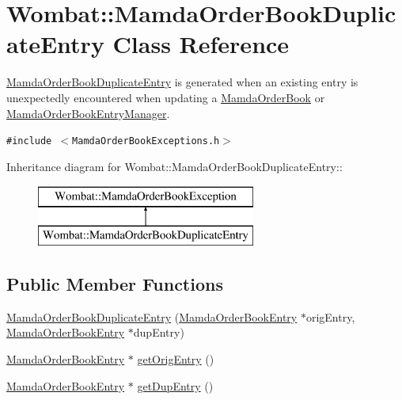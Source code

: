 \hypertarget{classWombat_1_1MamdaOrderBookDuplicateEntry}{
\section{Wombat::Mamda\-Order\-Book\-Duplicate\-Entry Class Reference}
\label{classWombat_1_1MamdaOrderBookDuplicateEntry}
}
\hyperlink{classWombat_1_1MamdaOrderBookDuplicateEntry}{Mamda\-Order\-Book\-Duplicate\-Entry} is generated when an existing entry is unexpectedly encountered when updating a \hyperlink{classWombat_1_1MamdaOrderBook}{Mamda\-Order\-Book} or \hyperlink{classWombat_1_1MamdaOrderBookEntryManager}{Mamda\-Order\-Book\-Entry\-Manager}.  


{\tt \#include $<$Mamda\-Order\-Book\-Exceptions.h$>$}

Inheritance diagram for Wombat::Mamda\-Order\-Book\-Duplicate\-Entry::\begin{figure}[H]
\begin{center}
\leavevmode
\includegraphics[height=2cm]{classWombat_1_1MamdaOrderBookDuplicateEntry}
\end{center}
\end{figure}
\subsection*{Public Member Functions}
\begin{CompactItemize}
\item 
\hyperlink{classWombat_1_1MamdaOrderBookDuplicateEntry_a5171895c879bb9e96daa4bff3617b94}{Mamda\-Order\-Book\-Duplicate\-Entry} (\hyperlink{classWombat_1_1MamdaOrderBookEntry}{Mamda\-Order\-Book\-Entry} $\ast$orig\-Entry, \hyperlink{classWombat_1_1MamdaOrderBookEntry}{Mamda\-Order\-Book\-Entry} $\ast$dup\-Entry)
\item 
\hyperlink{classWombat_1_1MamdaOrderBookEntry}{Mamda\-Order\-Book\-Entry} $\ast$ \hyperlink{classWombat_1_1MamdaOrderBookDuplicateEntry_9db97c68200bc29e87022a3227974d8e}{get\-Orig\-Entry} ()
\item 
\hyperlink{classWombat_1_1MamdaOrderBookEntry}{Mamda\-Order\-Book\-Entry} $\ast$ \hyperlink{classWombat_1_1MamdaOrderBookDuplicateEntry_474ba39cfff54b592de745dfec026c44}{get\-Dup\-Entry} ()
\end{CompactItemize}


